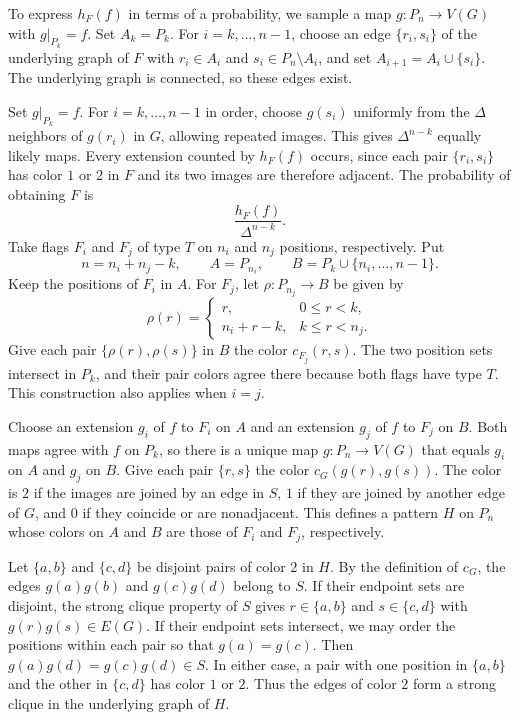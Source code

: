 \documentclass[preprint,11pt,numbers]{elsarticle-arxiv}
\numberwithin{equation}{section}
\theoremstyle{definition}
\begin{document}
To express $h_F(f)$ in terms of a probability, we sample a map
$g\colon P_n\to V(G)$ with $g|_{P_k}=f$. Set $A_k=P_k$. For
$i=k,\ldots,n-1$, choose an edge $\{r_i,s_i\}$ of the underlying
graph of $F$ with $r_i\in A_i$ and $s_i\in P_n\setminus A_i$, and
set $A_{i+1}=A_i\cup\{s_i\}$. The underlying graph is connected,
so these edges exist.

Set $g|_{P_k}=f$. For $i=k,\ldots,n-1$ in order, choose $g(s_i)$
uniformly from the $\Delta$ neighbors of $g(r_i)$ in $G$, allowing
repeated images. This gives $\Delta^{n-k}$ equally likely maps.
Every extension counted by $h_F(f)$ occurs, since each pair
$\{r_i,s_i\}$ has color $1$ or $2$ in $F$ and its two images
are therefore adjacent. The probability of obtaining $F$ is
\[
 \frac{h_F(f)}{\Delta^{n-k}}.
\]
Take flags $F_i$ and $F_j$ of type $T$ on $n_i$ and $n_j$ positions,
respectively. Put
\[
 n=n_i+n_j-k,\qquad A=P_{n_i},\qquad B=P_k\cup\{n_i,\ldots,n-1\}.
\]
Keep the positions of $F_i$ in $A$. For $F_j$, let
$\rho\colon P_{n_j}\to B$ be given by
\begin{equation}\label{eq:flag-relabeling}
 \rho(r)=
 \begin{cases}
  r, & 0\leq r<k,\\
  n_i+r-k, & k\leq r<n_j.
 \end{cases}
\end{equation}
Give each pair $\{\rho(r),\rho(s)\}$ in $B$ the color $c_{F_j}(r,s)$.
The two position sets intersect in $P_k$, and their pair colors agree
there because both flags have type $T$. This construction also applies
when $i=j$.

Choose an extension $g_i$ of $f$ to $F_i$ on $A$ and an extension
$g_j$ of $f$ to $F_j$ on $B$. Both maps agree with $f$ on $P_k$,
so there is a unique map $g\colon P_n\to V(G)$ that equals $g_i$ on
$A$ and $g_j$ on $B$. Give each pair $\{r,s\}$ the color
$c_G(g(r),g(s))$. The color is $2$ if the images are joined by an
edge in $S$, $1$ if they are joined by another edge of $G$, and $0$
if they coincide or are nonadjacent. This defines a pattern $H$ on
$P_n$ whose colors on $A$ and $B$ are those of $F_i$ and $F_j$,
respectively.

Let $\{a,b\}$ and $\{c,d\}$ be disjoint pairs of color $2$ in $H$.
By the definition of $c_G$, the edges $g(a)g(b)$ and $g(c)g(d)$
belong to $S$. If their endpoint sets are disjoint, the strong
clique property of $S$ gives $r\in\{a,b\}$ and $s\in\{c,d\}$ with
$g(r)g(s)\in E(G)$. If their endpoint sets intersect, we may order
the positions within each pair so that $g(a)=g(c)$. Then
$g(a)g(d)=g(c)g(d)\in S$. In either case, a pair with one position
in $\{a,b\}$ and the other in $\{c,d\}$ has color $1$ or $2$. Thus
the edges of color $2$ form a strong clique in the underlying graph
of $H$.
\end{document}
